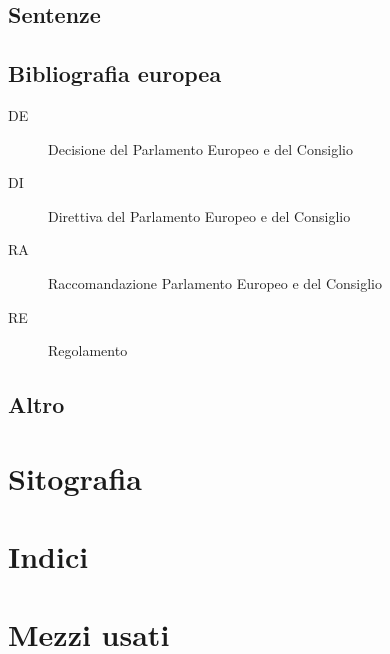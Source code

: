 \documentclass[a4paper]{book}%
\begin{document}
\section{Sentenze}
\printbibliography[keyword=SEN,heading=subbibliography]
 
 \section{Bibliografia europea}
 \begin{description}
 	\item[DE] Decisione del Parlamento Europeo e del Consiglio
 	\item[DI] Direttiva del Parlamento Europeo e del Consiglio
 	\item[RA] Raccomandazione Parlamento Europeo e del Consiglio
 	\item[RE] Regolamento
 \end{description}
\printbibliography[keyword=EU,heading=subbibliography]
\section{Altro}
\printbibliography[keyword=EXTRA, heading=subbibliography]
\printbibliography[keyword=BOOK,title={Pubblicazioni}]
\chapter{Sitografia}
\printbibliography[keyword=WWW,type=online,restoreclassic,annotation=false,heading=subbibliography,title={Siti}]

\chapter{Indici}
\printindex
\printindex[due]
\backmatter
\appendix

\chapter{Mezzi usati}
\CDMezziUsati
\end{document}
